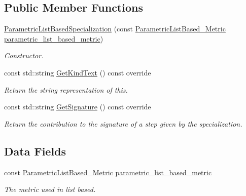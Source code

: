 \subsection*{Public Member Functions}
\begin{DoxyCompactItemize}
\item 
\hyperlink{classParametricListBasedSpecialization_aa5aace9795b539ffc54c82d656c82ed6}{Parametric\+List\+Based\+Specialization} (const \hyperlink{parametric__list__based_8hpp_af0e38be9a93de210a888144f6a52e498}{Parametric\+List\+Based\+\_\+\+Metric} \hyperlink{classParametricListBasedSpecialization_a16d8f9b3c3b1ad1a1544bb721f284b69}{parametric\+\_\+list\+\_\+based\+\_\+metric})
\begin{DoxyCompactList}\small\item\em Constructor. \end{DoxyCompactList}\item 
const std\+::string \hyperlink{classParametricListBasedSpecialization_a713bf4dc25984627ab7e0803f91510c2}{Get\+Kind\+Text} () const override
\begin{DoxyCompactList}\small\item\em Return the string representation of this. \end{DoxyCompactList}\item 
const std\+::string \hyperlink{classParametricListBasedSpecialization_ab4a9c8147842a19814c43444a8d502d6}{Get\+Signature} () const override
\begin{DoxyCompactList}\small\item\em Return the contribution to the signature of a step given by the specialization. \end{DoxyCompactList}\end{DoxyCompactItemize}
\subsection*{Data Fields}
\begin{DoxyCompactItemize}
\item 
const \hyperlink{parametric__list__based_8hpp_af0e38be9a93de210a888144f6a52e498}{Parametric\+List\+Based\+\_\+\+Metric} \hyperlink{classParametricListBasedSpecialization_a16d8f9b3c3b1ad1a1544bb721f284b69}{parametric\+\_\+list\+\_\+based\+\_\+metric}
\begin{DoxyCompactList}\small\item\em The metric used in list based. \end{DoxyCompactList}\end{DoxyCompactItemize}


